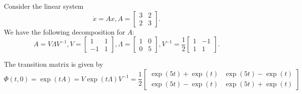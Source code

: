 \begin{refsection}
\begin{example}
Consider the linear system 
$$\dot{x} = Ax, A = \begin{bmatrix}
3 & 2\\
2 & 3
\end{bmatrix}.$$
We have the following decomposition for $A$:
$$A = V\Lambda V^{-1}, V=\begin{bmatrix}
1 & 1\\
-1 & 1
\end{bmatrix},\Lambda=\begin{bmatrix}
1 & 0\\
0 & 5
\end{bmatrix},V^{-1}=\frac{1}{2}\begin{bmatrix}
1 & -1\\
1 & 1
\end{bmatrix}.$$

The transition matrix is given by
$$\Phi(t,0) = \exp(tA) = V\exp(t\Lambda)V^{-1} = \frac{1}{2}\begin{bmatrix}
\exp(5t)+\exp(t) & \exp(5t)-\exp(t)\\
\exp(5t)-\exp(t) & \exp(5t) + \exp(t)
\end{bmatrix}$$	
\end{example}



\end{refsection}
